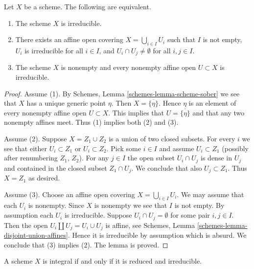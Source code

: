 \begin{lemma}
\label{lemma-characterize-irreducible}
Let $X$ be a scheme.
The following are equivalent.
\begin{enumerate}
\item The scheme $X$ is irreducible.
\item There exists an affine open covering $X = \bigcup_{i \in I} U_i$
such that $I$ is not empty, $U_i$ is irreducible for all $i \in I$, and
$U_i \cap U_j \not = \emptyset$ for all $i, j \in I$.
\item The scheme $X$ is nonempty and every nonempty affine open
$U \subset X$ is irreducible.
\end{enumerate}
\end{lemma}

\begin{proof}
Assume (1). By Schemes, Lemma \ref{schemes-lemma-scheme-sober}
we see that $X$ has a unique generic point $\eta$. Then
$X = \overline{\{\eta\}}$. Hence $\eta$ is an element of
every nonempty affine open $U \subset X$. This implies
that $U = \overline{\{\eta\}}$ and that any two nonempty affines
meet. Thus (1) implies both (2) and (3).

\medskip\noindent
Assume (2). Suppose $X = Z_1 \cup Z_2$ is a union of two closed subsets.
For every $i$ we see that either $U_i \subset Z_1$ or $U_i \subset Z_2$.
Pick some $i \in I$ and assume $U_i \subset Z_1$ (possibly after renumbering
$Z_1$, $Z_2$). For any $j \in I$ the open subset $U_i \cap U_j$ is dense in
$U_j$ and contained in the closed subset $Z_1 \cap U_j$. We conclude that
also $U_j \subset Z_1$. Thus $X = Z_1$ as desired.

\medskip\noindent
Assume (3). Choose an affine open covering $X = \bigcup_{i \in I} U_i$.
We may assume that each $U_i$ is nonempty.
Since $X$ is nonempty we see that $I$ is not empty.
By assumption each $U_i$ is irreducible.
Suppose $U_i \cap U_j = \emptyset$ for some pair $i, j \in I$.
Then the open $U_i \coprod  U_j = U_i \cup U_j$ is affine, see
Schemes, Lemma \ref{schemes-lemma-disjoint-union-affines}.
Hence it is irreducible by assumption which is absurd. We conclude that (3)
implies (2). The lemma is proved.
\end{proof}

\begin{lemma}
\label{lemma-characterize-integral}
A scheme $X$ is integral if and only if it is reduced and irreducible.
\end{lemma}

